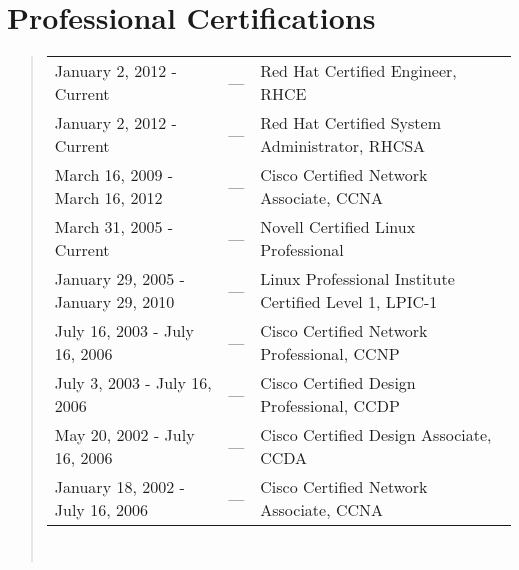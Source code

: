 \section*{Professional Certifications}
\begin{quote}
\begin{tabular}{l c l}
January 2, 2012 - Current & --- & Red Hat Certified Engineer, RHCE\\
January 2, 2012 - Current & --- & Red Hat Certified System Administrator, RHCSA\\
March 16, 2009 - March 16, 2012 & --- & Cisco Certified Network Associate, CCNA\\
March 31, 2005 - Current & --- & Novell Certified Linux Professional\\
January 29, 2005 - January 29, 2010 & --- & Linux Professional Institute Certified Level 1, LPIC-1\\
July 16, 2003 - July 16, 2006 & --- & Cisco Certified Network Professional, CCNP\\
July 3, 2003 - July 16, 2006 & --- & Cisco Certified Design Professional, CCDP\\
May 20, 2002 - July 16, 2006 & --- & Cisco Certified Design Associate, CCDA\\
January 18, 2002 - July 16, 2006 & --- & Cisco Certified Network Associate, CCNA\\
\end{tabular}\\
\end{quote}
